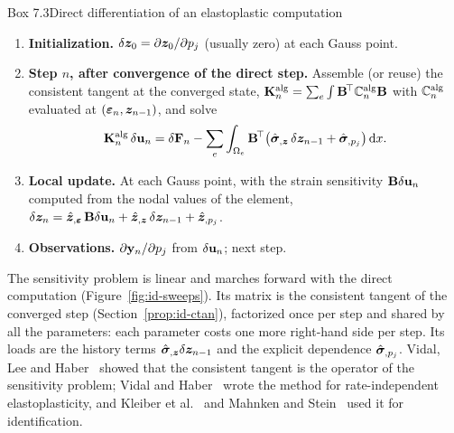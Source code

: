 \begin{gbox}{Box 7.3\quad Direct differentiation of an elastoplastic computation}
%
\begin{enumerate}[label=\textbf{\arabic*.},leftmargin=1.6em]
  \item \textbf{Initialization.} $\delta\bm{z}_0=\partial\bm{z}_0/\partial p_j$ (usually
  zero) at each Gauss point.
  \item \textbf{Step $n$, after convergence of the direct step.} Assemble (or
  reuse) the consistent tangent at the converged state,
  $\mathbf{K}^{\mathrm{alg}}_n=\sum_e\int\mathbf{B}^{\!\top}\mathbb{C}^{\mathrm{alg}}_n\mathbf{B}$ with $\mathbb{C}^{\mathrm{alg}}_n$ evaluated
  at $(\bm{\varepsilon}_n,\bm{z}_{n-1})$, and solve
  \[
    \mathbf{K}^{\mathrm{alg}}_n\,\delta\mathbf{u}_n=\delta\mathbf{F}_n
    -\sum_e\int_{\Omega_e}\mathbf{B}^{\!\top}\bigl(\hat{\bm{\sigma}}_{,\bm{z}}\,\delta\bm{z}_{n-1}+\hat{\bm{\sigma}}_{,p_j}\bigr)\,\mathrm{d} x .
  \]
  \item \textbf{Local update.} At each Gauss point, with the strain sensitivity
  $\mathbf{B}\delta\mathbf{u}_n$ computed from the nodal values of the element,
  $\delta\bm{z}_n=\hat{\bm{z}}_{,\bm{\varepsilon}}\,\mathbf{B}\delta\mathbf{u}_n+\hat{\bm{z}}_{,\bm{z}}\,\delta\bm{z}_{n-1}+\hat{\bm{z}}_{,p_j}$.
  \item \textbf{Observations.} $\partial\mathbf{y}_n/\partial p_j$ from $\delta\mathbf{u}_n$;
  next step.
\end{enumerate}
\end{gbox}
\noindent The sensitivity problem is linear and marches forward with the direct
computation (Figure~\ref{fig:id-sweeps}). Its matrix is the consistent tangent of
the converged step (Section~\ref{prop:id-ctan}), factorized once per step and
shared by all the parameters: each parameter costs one more right-hand side per
step. Its
loads are the history terms $\hat{\bm{\sigma}}_{,\bm{z}}\delta\bm{z}_{n-1}$ and the explicit
dependence $\hat{\bm{\sigma}}_{,p_j}$. Vidal, Lee and Haber~\cite{VidalLeeHaber1991}
showed that the consistent tangent is the operator of the sensitivity problem;
Vidal and Haber~\cite{VidalHaber1993} wrote the method for rate-independent
elastoplasticity, and Kleiber et al.~\cite{KleiberEtAl1997} and Mahnken and
Stein~\cite{MahnkenStein1996} used it for identification.

